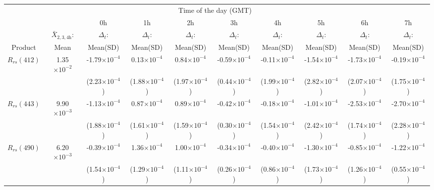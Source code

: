 \documentclass[preview]{standalone}
\begin{document}
\begin{threeparttable}
\scriptsize
\centering
\setlength\tabcolsep{1.5pt} %
\begin{tabular}{cccccccccc} \hline
   &   \multicolumn{8}{c}{Time of the day (GMT)}    \\ \cline{3-10}
& &    0h    & 1h  &  2h  &  3h  &  4h  &  5h  &  6h   &  7h   \\ 
   & $\bar{X}_{2,3,4\text{h}}$: &  $\Delta_t$:    & $\Delta_t$:  &  $\Delta_t$:  &  $\Delta_t$:  &  $\Delta_t$:  &  $\Delta_t$:  &  $\Delta_t$:   &  $\Delta_t$:  \\ 
Product & Mean\tnote{*}  &     Mean(SD)\tnote{*}    & Mean(SD)\tnote{*}  &  Mean(SD)\tnote{*}  &  Mean(SD)\tnote{*}  &  Mean(SD)\tnote{*}  &  Mean(SD)\tnote{*}  &  Mean(SD)\tnote{*}   &  Mean(SD)\tnote{*}  \\ \hline \hline 
$R_{rs}(412)$ & 1.35$\times10^{-2}$	& -1.79$\times10^{-4}$ &    0.13$\times10^{-4}$ &    0.84$\times10^{-4}$ &   -0.59$\times10^{-4}$ &   -0.11$\times10^{-4}$ &   -1.54$\times10^{-4}$ &   -1.73$\times10^{-4}$ &   -0.19$\times10^{-4}$ \\
	&& (2.23$\times10^{-4}$) & (1.88$\times10^{-4}$) & (1.97$\times10^{-4}$) & (0.44$\times10^{-4}$) & (1.99$\times10^{-4}$) & (2.82$\times10^{-4}$) & (2.07$\times10^{-4}$) & (1.75$\times10^{-4}$) \\ \hline
$R_{rs}(443)$ & 9.90$\times10^{-3}$	& -1.13$\times10^{-4}$ &    0.87$\times10^{-4}$ &    0.89$\times10^{-4}$ &   -0.42$\times10^{-4}$ &   -0.18$\times10^{-4}$ &   -1.01$\times10^{-4}$ &   -2.53$\times10^{-4}$ &   -2.70$\times10^{-4}$ \\
	&& (1.88$\times10^{-4}$) & (1.61$\times10^{-4}$) & (1.59$\times10^{-4}$) & (0.30$\times10^{-4}$) & (1.54$\times10^{-4}$) & (2.42$\times10^{-4}$) & (1.74$\times10^{-4}$) & (2.28$\times10^{-4}$) \\ \hline
$R_{rs}(490)$ & 6.20$\times10^{-3}$	& -0.39$\times10^{-4}$ &    1.36$\times10^{-4}$ &    1.00$\times10^{-4}$ &   -0.34$\times10^{-4}$ &   -0.40$\times10^{-4}$ &   -1.30$\times10^{-4}$ &   -0.85$\times10^{-4}$ &   -1.22$\times10^{-4}$ \\
	&& (1.54$\times10^{-4}$) & (1.29$\times10^{-4}$) & (1.11$\times10^{-4}$) & (0.26$\times10^{-4}$) & (0.86$\times10^{-4}$) & (1.73$\times10^{-4}$) & (1.26$\times10^{-4}$) & (0.55$\times10^{-4}$) \\ \hline

\end{tabular}
\end{threeparttable}
\end{document}
